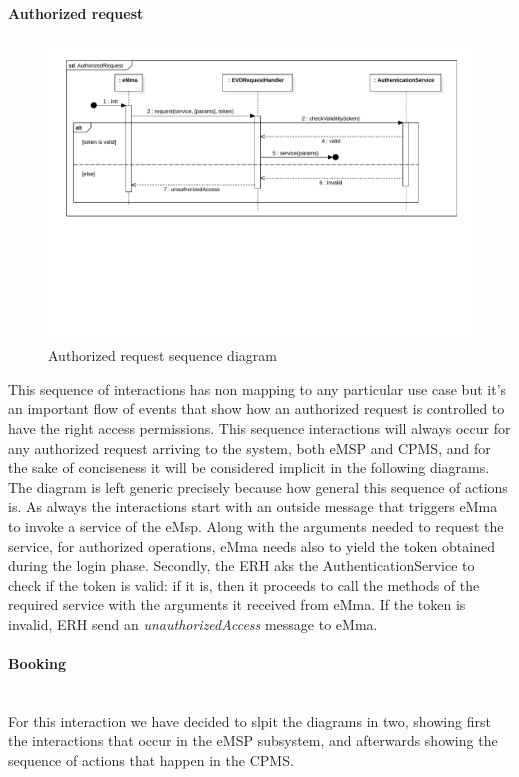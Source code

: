 \paragraph{Authorized request}\mbox{}
\begin{figure}[H]
    \centering
    \includegraphics[trim={0 7cm 0 0},clip, width=1\textwidth]{Images/cp2/runtime/AuthorizedRequest.pdf}
    \caption{Authorized request sequence diagram}
    \label{fig:auth_request}
\end{figure}
This sequence of interactions has non mapping to any particular use case but it's an important flow of events that show how an authorized request is controlled to have the right access permissions. This sequence interactions will always occur for any authorized request arriving to the system, both eMSP and CPMS, and for the sake of conciseness it will be considered implicit in the following diagrams. The diagram is left generic precisely because how general this sequence of actions is. As always the interactions start with an outside message that triggers eMma to invoke a service of the eMsp. Along with the arguments needed to request the service, for authorized operations, eMma needs also to yield the token obtained during the login phase. Secondly, the ERH aks the AuthenticationService to check if the token is valid: if it is, then it proceeds to call the methods of the required service with the arguments it received from eMma. If the token is invalid, ERH send an \textit{unauthorizedAccess} message to eMma.
\pagebreak

\paragraph{Booking}\mbox{}\\
For this interaction we have decided to slpit the diagrams in two, showing first the interactions that occur in the eMSP subsystem, and afterwards showing the sequence of actions that happen in the CPMS.

